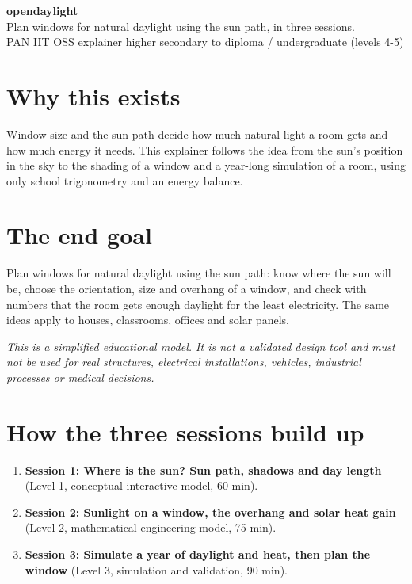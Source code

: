 \documentclass[11pt,a4paper]{article}
\begin{document}
\begin{center}{\LARGE\bfseries opendaylight}\\[0.4em]{\large Plan windows for natural daylight using the sun path, in three sessions.}\\[0.2em]\small PAN IIT OSS explainer \textbullet{} higher secondary to diploma / undergraduate (levels 4-5)\end{center}

\section*{Why this exists}
Window size and the sun path decide how much natural light a room gets and how much energy it needs. This explainer follows the idea from the sun's position in the sky to the shading of a window and a year-long simulation of a room, using only school trigonometry and an energy balance.

\section*{The end goal}
Plan windows for natural daylight using the sun path: know where the sun will be, choose the orientation, size and overhang of a window, and check with numbers that the room gets enough daylight for the least electricity. The same ideas apply to houses, classrooms, offices and solar panels.

\textit{This is a simplified educational model. It is not a validated design tool and must not be used for real structures, electrical installations, vehicles, industrial processes or medical decisions.}

\section*{How the three sessions build up}
\begin{enumerate}[nosep]
\item \textbf{Session 1: Where is the sun? Sun path, shadows and day length} (Level 1, conceptual interactive model, 60 min).
\item \textbf{Session 2: Sunlight on a window, the overhang and solar heat gain} (Level 2, mathematical engineering model, 75 min).
\item \textbf{Session 3: Simulate a year of daylight and heat, then plan the window} (Level 3, simulation and validation, 90 min).
\end{enumerate}
\end{document}
